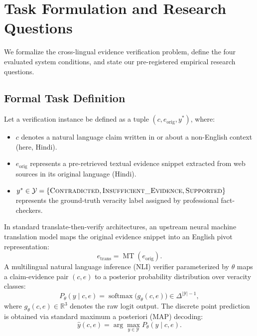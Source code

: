 \section{Task Formulation and Research Questions}
\label{sec:task_formulation}

We formalize the cross-lingual evidence verification problem, define the four evaluated system conditions, and state our pre-registered empirical research questions.

\subsection{Formal Task Definition}
Let a verification instance be defined as a tuple $(c, e_{\text{orig}}, y^*)$, where:
\begin{itemize}
    \item $c$ denotes a natural language claim written in or about a non-English context (here, Hindi).
    \item $e_{\text{orig}}$ represents a pre-retrieved textual evidence snippet extracted from web sources in its original language (Hindi).
    \item $y^* \in \mathcal{Y} = \{\textsc{Contradicted}, \textsc{Insufficient\_Evidence}, \textsc{Supported}\}$ represents the ground-truth veracity label assigned by professional fact-checkers.
\end{itemize}

In standard translate-then-verify architectures, an upstream neural machine translation model maps the original evidence snippet into an English pivot representation:
\begin{equation}
    e_{\text{trans}} = \operatorname{MT}(e_{\text{orig}}).
\end{equation}
A multilingual natural language inference (NLI) verifier parameterized by $\theta$ maps a claim-evidence pair $(c, e)$ to a posterior probability distribution over veracity classes:
\begin{equation}
    P_\theta(y \mid c, e) = \operatorname{softmax}\big(g_\theta(c, e)\big) \in \Delta^{|\mathcal{Y}|-1},
\end{equation}
where $g_\theta(c, e) \in \mathbb{R}^3$ denotes the raw logit output. The discrete point prediction is obtained via standard maximum a posteriori (MAP) decoding:
\begin{equation}
    \hat{y}(c, e) = \arg\max_{y \in \mathcal{Y}} P_\theta(y \mid c, e).
\end{equation}

